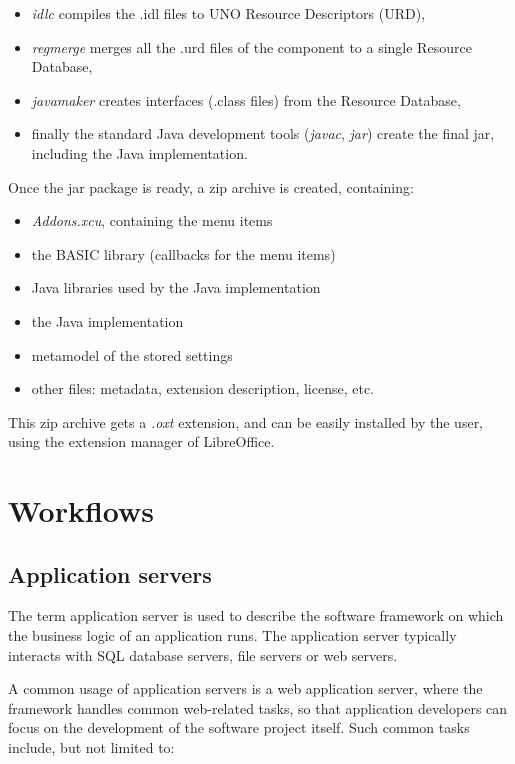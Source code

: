 \begin{itemize}
\item \emph{idlc} compiles the .idl files to UNO Resource Descriptors (URD),
\item \emph{regmerge} merges all the .urd files of the component to a single Resource Database,
\item \emph{javamaker} creates interfaces (.class files) from the Resource Database,
\item finally the standard Java development tools (\emph{javac}, \emph{jar})
create the final jar, including the Java implementation.
\end{itemize}

Once the jar package is ready, a zip archive is created, containing:

\begin{itemize}
\item \emph{Addons.xcu}, containing the menu items
\item the BASIC library (callbacks for the menu items)
\item Java libraries used by the Java implementation
\item the Java implementation
\item metamodel of the stored settings
\item other files: metadata, extension description, license, etc.
\end{itemize}

This zip archive gets a \emph{.oxt} extension, and can be easily installed
by the user, using the extension manager of LibreOffice.

\section{Workflows}

\subsection{Application servers}

The term application server is used to describe the software framework on which
the business logic of an application runs. The application server typically
interacts with SQL database servers, file servers or web servers.


A common usage of application servers is a web application server, where the
framework handles common web-related tasks, so that application developers can
focus on the development of the software project itself. Such common tasks
include, but not limited to:

